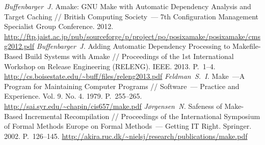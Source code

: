 \begin{thebibliography}{9}
	\textit{Buffenbarger~J.} Amake: GNU Make with Automatic Dependency Analysis and Target Caching // British Computing Society~--- 7th Configuration Management Specialist Group Conference. 2012. \url{http://ftp.jaist.ac.jp/pub/sourceforge/p/project/po/posixamake/posixamake/cmsg2012.pdf}
	\textit{Buffenbarger~J.} Adding Automatic Dependency Processing to Makefile-Based Build Systems with Amake // Proceedings of the 1st International Workshop on Release Engineering (RELENG). IEEE. 2013. P.~1--4. \url{http://cs.boisestate.edu/~buff/files/releng2013.pdf}
	\textit{Feldman~S.~I.} Make~---A Program for Maintaining Computer Programs // Software~--- Practice and Experience. Vol. 9. No. 4. 1979. P.~255--265. \url{http://sai.syr.edu/~chapin/cis657/make.pdf}
	\textit{J{\o}rgensen~N.} Safeness of Make-Based Incremental Recompilation // Proceedings of the International Symposium of Formal Methods Europe on Formal Methods~--- Getting IT Right. Springer. 2002. P.~126--145. \url{http://akira.ruc.dk/~nielsj/research/publications/make.pdf}
\end{thebibliography}